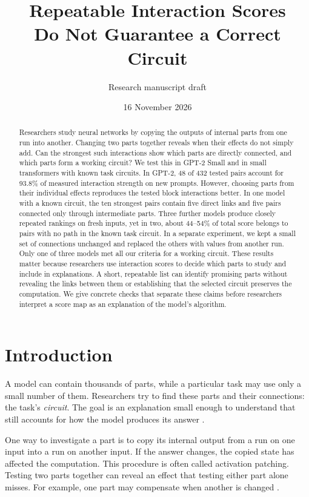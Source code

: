 \documentclass[11pt]{article}
\title{Repeatable Interaction Scores\\Do Not Guarantee a Correct Circuit}
\author{Research manuscript draft}
\date{16 November 2026}
\begin{document}
\maketitle
\begin{abstract}
Researchers study neural networks by copying the outputs of internal parts
from one run into another. Changing two parts together reveals when their
effects do not simply add. Can the strongest such interactions show which
parts are directly connected, and which parts form a working circuit? We test
this in GPT-2 Small and in small transformers with known task circuits. In
GPT-2, 48 of 432 tested pairs account for 93.8\% of measured interaction
strength on new prompts. However, choosing parts from their individual effects
reproduces the tested block interactions better. In one model with a known
circuit, the ten strongest pairs contain five direct links and five pairs
connected only through intermediate parts. Three further models produce
closely repeated rankings on fresh inputs, yet in two, about 44--54\% of total score
belongs to pairs with no path in the known task circuit. In a separate
experiment, we kept a small set of connections unchanged and replaced the others
with values from another run. Only one of three models met all our criteria
for a working circuit. These results matter because researchers
use interaction scores to decide which parts to study and include in explanations.
A short, repeatable list can identify promising parts without revealing the
links between them or establishing that the selected circuit preserves the
computation. We give concrete checks that separate these claims before
researchers interpret a score map as an explanation of the model's algorithm.
\end{abstract}

\section{Introduction}
A model can contain thousands of parts, while a particular task may use only
a small number of them. Researchers try to find these parts and their
connections: the task's \emph{circuit}. The goal is an explanation small enough
to understand that still accounts for how the model produces its answer
\citep{conmy2023acdc,hanna2024faithfulness,kramar2024atp}.

One way to investigate a part is to copy its internal output from a run on one
input into a run on another input. If the answer changes, the copied state
has affected the computation. This procedure is often called activation
patching. Testing two parts together can reveal an effect that testing either
part alone misses. For example, one part may compensate when another is changed
\citep{vaidyanathan2026mediators,gong2026coax}.
\end{document}
